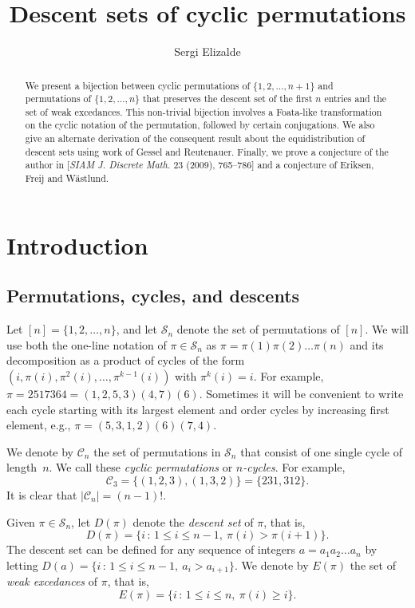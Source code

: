 \documentclass[11pt]{amsart}
\author{Sergi Elizalde}
\title{Descent sets of cyclic permutations}
\renewcommand\S{\mathcal S}
\newcommand\C{\mathcal C}
\begin{document}
\maketitle

\begin{abstract}
We present a bijection between cyclic permutations of $\{1,2,\dots,n+1\}$ and permutations of $\{1,2,\dots,n\}$
that preserves the descent set of the first $n$ entries and the set of weak excedances.
This non-trivial bijection involves a Foata-like transformation on the cyclic notation
of the permutation, followed by certain conjugations.
We also give an alternate derivation of the consequent result about the equidistribution of descent sets using work of Gessel and Reutenauer.
Finally, we prove a conjecture of the author in [{\it SIAM J. Discrete Math.} 23 (2009), 765--786] and a conjecture of Eriksen, Freij and W\"astlund.
\end{abstract}


\section{Introduction}\label{sec:intro}

\subsection{Permutations, cycles, and descents}

Let $[n]=\{1,2,\dots,n\}$, and let $\S_n$ denote the set of permutations of $[n]$. We will use both the one-line notation of $\pi\in\S_n$
as $\pi=\pi(1)\pi(2)\dots\pi(n)$ and its decomposition as a product
of cycles of the form $(i,\pi(i),\pi^2(i),\dots,\pi^{k-1}(i))$ with $\pi^k(i)=i$.
For example, $\pi=2517364=(1,2,5,3)(4,7)(6)$. Sometimes it will be convenient to write
each cycle starting with its largest element and order cycles by increasing first element, e.g., $\pi=(5,3,1,2)(6)(7,4)$.

We denote by $\C_n$ the set of permutations in $\S_n$ that consist of one single cycle of length~$n$. We call these {\em cyclic permutations} or {\em $n$-cycles}.
For example, $$\C_3=\{(1,2,3),(1,3,2)\}=\{231,312\}.$$ It is clear that $|\C_n|=(n-1)!$.

Given $\pi\in\S_n$, let $D(\pi)$
denote the {\em descent set} of $\pi$, that is,
$$D(\pi)=\{i\,:\,1\le i\le n-1,\ \pi(i)>\pi(i+1)\}.$$
The descent set can be defined for any sequence of integers $a=a_1 a_2 \dots a_n$
by letting $D(a)=\{i\,:\,1\le i\le n-1,\ a_i>a_{i+1}\}$. We denote by $E(\pi)$ the set of {\em weak excedances} of $\pi$, that is,
$$E(\pi)=\{i\,:\,1\le i\le n,\ \pi(i)\ge i\}.$$
\end{document}
